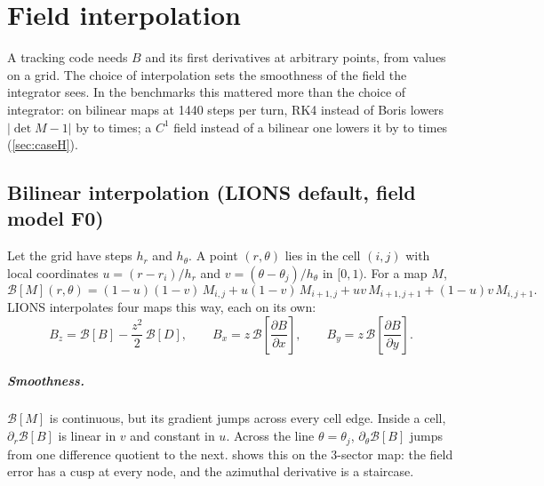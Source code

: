 \chapter{Field interpolation}\label{ch:interpolation}

A tracking code needs $B$ and its first derivatives at arbitrary points, from values on a grid.
The choice of interpolation sets the smoothness of the field the integrator sees.
In the benchmarks this mattered more than the choice of integrator: on bilinear maps at 1440 steps per turn, RK4 instead of
Boris lowers $|\det M-1|$ by \HBorisOverRkMin{} to \HBorisOverRkMax{} times; a $C^1$ field instead of a bilinear one lowers it by
\HDetRatioMin{} to \HDetRatioMax{} times (\cref{sec:caseH}).

\section{Bilinear interpolation (LIONS default, field model F0)}
Let the grid have steps $h_r$ and $h_\theta$.
A point $(r,\theta)$ lies in the cell $(i,j)$ with local coordinates $u = (r-r_i)/h_r$ and $v = (\theta-\theta_j)/h_\theta$
in $[0,1)$.
For a map $M$,
\begin{equation}
\mathcal{B}[M](r,\theta) = (1-u)(1-v)\,M_{i,j} + u(1-v)\,M_{i+1,j} + uv\,M_{i+1,j+1} + (1-u)v\,M_{i,j+1}.
\end{equation}
LIONS interpolates four maps this way, each on its own:
\begin{equation}
B_z = \mathcal{B}[B] - \frac{z^2}{2}\,\mathcal{B}[D],\qquad
B_x = z\,\mathcal{B}\!\left[\frac{\partial B}{\partial x}\right],\qquad
B_y = z\,\mathcal{B}\!\left[\frac{\partial B}{\partial y}\right].
\end{equation}

\paragraph{Smoothness.}
$\mathcal{B}[M]$ is continuous, but its gradient jumps across every cell edge.
Inside a cell, $\partial_r\mathcal{B}[B]$ is linear in $v$ and constant in $u$.
Across the line $\theta = \theta_j$, $\partial_\theta\mathcal{B}[B]$ jumps from one difference quotient to the next.
 shows this on the 3-sector map: the field error has a cusp at every node, and the azimuthal
derivative is a staircase.


